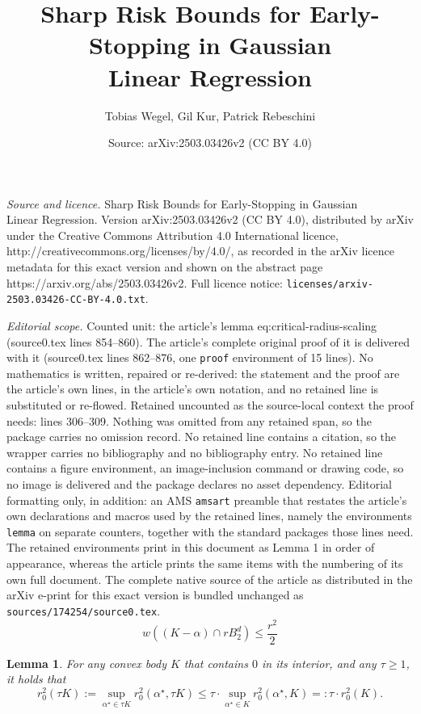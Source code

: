 \documentclass[10pt,a4paper]{amsart}
\title{Sharp Risk Bounds for Early-Stopping in Gaussian \\ Linear Regression}
\author{Tobias Wegel, Gil Kur, Patrick Rebeschini}
\date{Source: arXiv:2503.03426v2 (CC BY 4.0)}
\newtheorem{lemma}{Lemma}
\newcommand{\alphastar}{\alpha^\star}
\newcommand{\pr}[1]{\left(#1\right)}
\newcommand{\rzero}[0]{r_{0}}
\begin{document}
\maketitle

\noindent\emph{Source and licence.} Sharp Risk Bounds for Early-Stopping in Gaussian \\ Linear Regression. Version arXiv:2503.03426v2 (CC BY 4.0), distributed by arXiv under the Creative Commons Attribution 4.0 International licence, http://creativecommons.org/licenses/by/4.0/, as recorded in the arXiv licence metadata for this exact version and shown on the abstract page https://arxiv.org/abs/2503.03426v2. Full licence notice: \texttt{licenses/arxiv-2503.03426-CC-BY-4.0.txt}.\par\smallskip

\noindent\textit{Editorial scope.} Counted unit: the article's lemma eq:critical-radius-scaling (source0.tex lines 854--860). The article's complete original proof of it is delivered with it (source0.tex lines 862--876, one \texttt{proof} environment of 15 lines). No mathematics is written, repaired or re-derived: the statement and the proof are the article's own lines, in the article's own notation, and no retained line is substituted or re-flowed.  Retained uncounted as the source-local context the proof needs: lines 306--309.  Nothing was omitted from any retained span, so the package carries no omission record.  No retained line contains a citation, so the wrapper carries no bibliography and no bibliography entry.  No retained line contains a figure environment, an image-inclusion command or drawing code, so no image is delivered and the package declares no asset dependency.  Editorial formatting only, in addition: an AMS \texttt{amsart} preamble that restates the article's own declarations and macros used by the retained lines, namely the environments \texttt{lemma} on separate counters, together with the standard packages those lines need.  The retained environments print in this document as Lemma 1 in order of appearance, whereas the article prints the same items with the numbering of its own full document.  The complete native source of the article as distributed in the arXiv e-print for this exact version is bundled unchanged as \texttt{sources/174254/source0.tex}.
\begin{equation}
\label{eq:localized-inequality}
    w\pr{(K-\alpha) \cap r B^d_2}\leq \frac{r^2}{2}
\end{equation}

\begin{lemma}
    For any convex body $K$ that contains $0$ in its interior, and any $\tau\geq 1$, it holds that
\begin{equation}
\label{eq:critical-radius-scaling}
    \rzero^2(\tau K):=\sup_{\alphastar\in \tau K}\rzero^2(\alphastar,\tau K)\leq \tau \cdot \sup_{\alphastar\in K} \rzero^2(\alphastar,K) =: \tau \cdot \rzero^2(K).
\end{equation}
\end{lemma}
\end{document}
